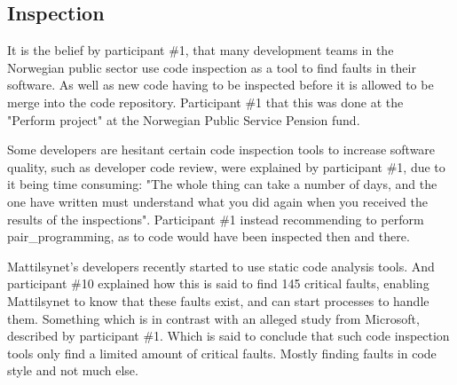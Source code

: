 \subsection{Inspection}
It is the belief by participant \#1, that many development teams in the Norwegian public sector use code inspection as a tool to find faults in their software. As well as new code having to be inspected before it is allowed to be merge into the code repository. Participant \#1 that this was done at the "Perform project" at the Norwegian Public Service Pension fund.



Some developers are hesitant certain code inspection tools to increase software quality, such as developer code review, were explained by participant \#1, due to it being time consuming: "The whole thing can take a number of days, and the one have written must understand what you did again when you received the results of the inspections". Participant \#1 instead recommending to perform \gls{pair_programming}, as to code would have been inspected then and there.


Mattilsynet's developers recently started to use static code analysis tools. And participant \#10 explained how this is said to find 145 critical faults, enabling Mattilsynet to know that these faults exist, and can start processes to handle them. Something which is in contrast with an alleged study from Microsoft, described by participant \#1. Which is said to conclude that such code inspection tools only find a limited amount of critical faults. Mostly finding faults in code style and not much else.


